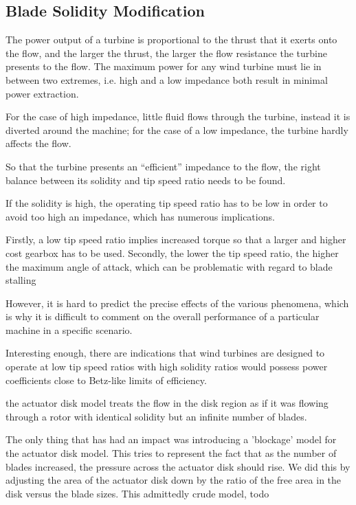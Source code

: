 

\subsection{Blade Solidity Modification}
\label{sec:solidity}
%
%

The power output of a turbine is proportional to the thrust that it
exerts onto the flow, and the larger the thrust, the larger the flow
resistance the turbine presents to the flow. The maximum power for any
wind turbine must lie in between two extremes, i.e. high and
a low impedance both result in minimal power
extraction\cite{solidity_oxford}.  

For the case of high impedance, little fluid flows through the
turbine, instead it is diverted around the machine; for the case of a
low impedance, the turbine hardly affects the flow. 

So that the turbine presents an ``efficient'' impedance to the flow, the 
right balance between its solidity and tip speed ratio needs to be found.

If the solidity is high, the operating tip speed ratio has to be low in
order to avoid too high an impedance, which has numerous implications. 

Firstly, a low tip speed ratio implies increased torque so that a larger
and higher cost gearbox has to be used. Secondly, the lower the tip
speed ratio, the higher the maximum angle of attack, which can be
problematic with regard to blade stalling

However, it is hard to predict the precise effects of the various
phenomena, which is why it is difficult to comment on the overall
performance of a particular machine in a specific
scenario. 

Interesting enough, there are indications that wind turbines are
designed to operate at low tip speed ratios with high solidity ratios
would possess power coefficients close to Betz-like limits of
efficiency\cite{WE:WE118}. 


the actuator disk model treats the flow in the disk region as if it was
flowing through a rotor with identical solidity but an infinite number
of blades. 

The only thing that has had an impact was introducing a 'blockage' model
for the actuator disk model. This tries to represent the fact that as
the number of blades increased, the pressure across the actuator disk
should rise. We did this by adjusting the area of the actuator disk down
by the ratio of the free area in the disk versus the blade sizes. 
This admittedly crude model, todo


